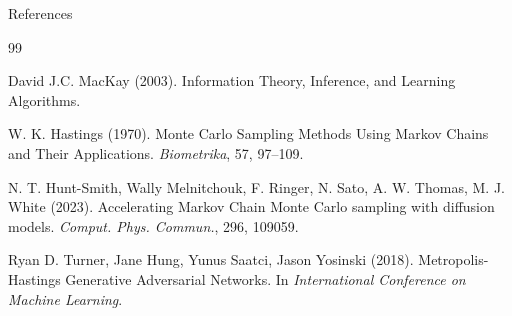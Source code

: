 \documentclass[aspectratio=169]{beamer}
\begin{document}
\begin{frame}[allowframebreaks]{References}
    \begin{thebibliography}{99}

        David J.C. MacKay (2003). 
        \newblock Information Theory, Inference, and Learning Algorithms.

        W. K. Hastings (1970).
        \newblock Monte Carlo Sampling Methods Using Markov Chains and Their Applications.
        \newblock \emph{Biometrika}, 57, 97--109.

        N. T. Hunt-Smith, Wally Melnitchouk, F. Ringer, N. Sato, A. W. Thomas, M. J. White (2023).
        \newblock Accelerating Markov Chain Monte Carlo sampling with diffusion models.
        \newblock \emph{Comput. Phys. Commun.}, 296, 109059.

        Ryan D. Turner, Jane Hung, Yunus Saatci, Jason Yosinski (2018).
        \newblock Metropolis-Hastings Generative Adversarial Networks.
        \newblock In \emph{International Conference on Machine Learning}.

    \end{thebibliography}
\end{frame}
\end{document}

